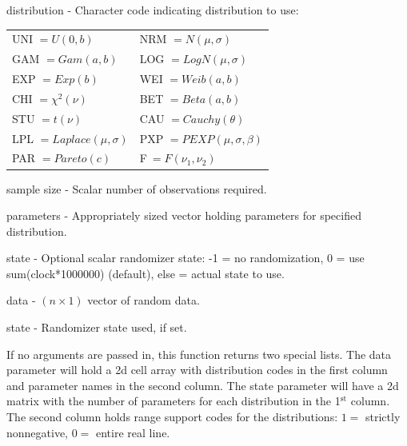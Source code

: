 \documentclass{book}
\newcommand{\textcode}[1]{\textsf{\small #1}}   %
\begin{document}
\begin{compactitem}

\item \textcode{distribution} - Character code indicating distribution to use:

\begin{tabular}{ll}
UNI $=U\left( 0,b\right)$ & NRM $=N\left( \mu ,\sigma \right)$ \\
GAM $=Gam\left( a,b\right)$ & LOG $=LogN\left( \mu ,\sigma \right)$ \\
EXP $=Exp\left( b\right)$ & WEI $=Weib\left( a,b\right)$ \\
CHI $=\chi ^{2}\left( \nu \right)$ & BET $=Beta\left( a,b\right)$ \\
STU $=t\left( \nu \right)$ & CAU $=Cauchy\left( \theta \right)$ \\
LPL $=Laplace\left( \mu ,\sigma \right)$ & PXP $=PEXP\left( \mu ,\sigma
,\beta \right)$ \\
PAR $=Pareto\left( c\right)$ & F$\ =F\left( \nu _{1},\nu _{2}\right)$%
\end{tabular}

\item \textcode{sample size} - Scalar number of observations required.

\item \textcode{parameters} - Appropriately sized vector holding parameters for specified distribution.

\item \textcode{state} - Optional scalar randomizer state: -1 = no randomization, 0 = use \textcode{sum(clock*1000000)} (default), else = actual state to use.

\item \textcode{data} - $\left( n \times 1 \right)$ vector of random data.

\item \textcode{state} - Randomizer state used, if set.

\end{compactitem}

If no arguments are passed in, this function returns two special
lists. The \textcode{data} parameter will hold a 2d cell array with
distribution codes in the first column and parameter names in the
second column. The \textcode{state} parameter will have a 2d matrix
with the number of parameters for each distribution in the
1$^{\text{st}}$ column. The second column holds range support codes
for the distributions: $1=$ strictly nonnegative, $0=$ entire real
line.
\end{document}
